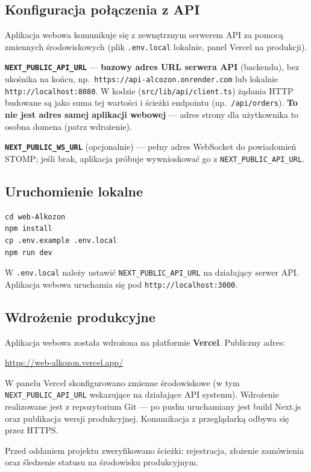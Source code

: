 \documentclass[12pt,a4paper]{report}
\newcommand{\blok}[1]{\needspace{9\baselineskip}#1}
\newenvironment{calosc}{%
  \Needspace{17\baselineskip}%
  \begin{samepage}%
}{%
  \end{samepage}%
}
\begin{document}
\begin{calosc}
\section{Konfiguracja połączenia z API}

Aplikacja webowa komunikuje się z zewnętrznym serwerem API za pomocą zmiennych środowiskowych (plik \texttt{.env.local} lokalnie, panel Vercel na produkcji).

\noindent\textbf{\texttt{NEXT\_PUBLIC\_API\_URL}} --- \textbf{bazowy adres URL serwera API} (backendu), bez ukośnika na końcu, np.\ \texttt{https://api-alcozon.onrender.com} lub lokalnie \texttt{http://localhost:8080}. W kodzie (\texttt{src/lib/api/client.ts}) żądania HTTP budowane są jako suma tej wartości i ścieżki endpointu (np.\ \texttt{/api/orders}). \textbf{To nie jest adres samej aplikacji webowej} --- adres strony dla użytkownika to osobna domena (patrz wdrożenie).

\noindent\textbf{\texttt{NEXT\_PUBLIC\_WS\_URL}} (opcjonalnie) --- pełny adres WebSocket do powiadomień STOMP; jeśli brak, aplikacja próbuje wywnioskować go z \texttt{NEXT\_PUBLIC\_API\_URL}.
\end{calosc}

\begin{calosc}
\section{Uruchomienie lokalne}

\begin{lstlisting}[style=shell]
cd web-Alkozon
npm install
cp .env.example .env.local
npm run dev
\end{lstlisting}
\noindent W \texttt{.env.local} należy ustawić \texttt{NEXT\_PUBLIC\_API\_URL} na działający serwer API. Aplikacja webowa uruchamia się pod \texttt{http://localhost:3000}.
\end{calosc}

\begin{calosc}
\section{Wdrożenie produkcyjne}

\blok{%
Aplikacja webowa została wdrożona na platformie \textbf{Vercel}. Publiczny adres:
}

\noindent\url{https://web-alkozon.vercel.app/}

\noindent W panelu Vercel skonfigurowano zmienne środowiskowe (w tym \texttt{NEXT\_PUBLIC\_API\_URL} wskazujące na działające API systemu). Wdrożenie realizowane jest z repozytorium Git --- po pushu uruchamiany jest build Next.js oraz publikacja wersji produkcyjnej. Komunikacja z przeglądarką odbywa się przez HTTPS.

\noindent Przed oddaniem projektu zweryfikowano ścieżki: rejestracja, złożenie zamówienia oraz śledzenie statusu na środowisku produkcyjnym.
\end{calosc}
\end{document}
